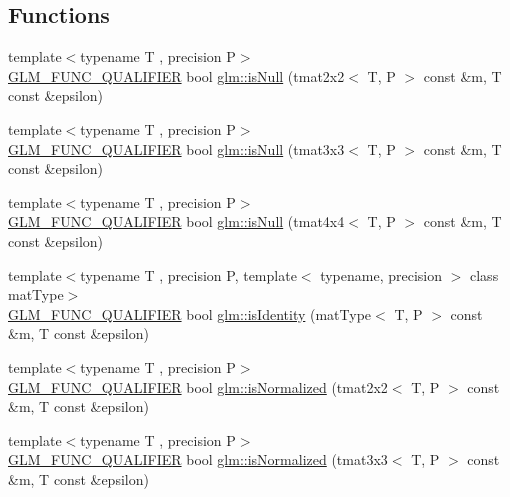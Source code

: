 \subsection*{Functions}
\begin{DoxyCompactItemize}
\item 
{\footnotesize template$<$typename T , precision P$>$ }\\\mbox{\hyperlink{setup_8hpp_a33fdea6f91c5f834105f7415e2a64407}{G\+L\+M\+\_\+\+F\+U\+N\+C\+\_\+\+Q\+U\+A\+L\+I\+F\+I\+ER}} bool \mbox{\hyperlink{group__gtx__matrix__query_ga37e535cbeaea383b8c1247b98875cd4b}{glm\+::is\+Null}} (tmat2x2$<$ T, P $>$ const \&m, T const \&epsilon)
\item 
{\footnotesize template$<$typename T , precision P$>$ }\\\mbox{\hyperlink{setup_8hpp_a33fdea6f91c5f834105f7415e2a64407}{G\+L\+M\+\_\+\+F\+U\+N\+C\+\_\+\+Q\+U\+A\+L\+I\+F\+I\+ER}} bool \mbox{\hyperlink{group__gtx__matrix__query_gac67a5c7e029a84b74b02ac9599b8972d}{glm\+::is\+Null}} (tmat3x3$<$ T, P $>$ const \&m, T const \&epsilon)
\item 
{\footnotesize template$<$typename T , precision P$>$ }\\\mbox{\hyperlink{setup_8hpp_a33fdea6f91c5f834105f7415e2a64407}{G\+L\+M\+\_\+\+F\+U\+N\+C\+\_\+\+Q\+U\+A\+L\+I\+F\+I\+ER}} bool \mbox{\hyperlink{group__gtx__matrix__query_ga326de496972051413c7b44b85fc9cb6e}{glm\+::is\+Null}} (tmat4x4$<$ T, P $>$ const \&m, T const \&epsilon)
\item 
{\footnotesize template$<$typename T , precision P, template$<$ typename, precision $>$ class mat\+Type$>$ }\\\mbox{\hyperlink{setup_8hpp_a33fdea6f91c5f834105f7415e2a64407}{G\+L\+M\+\_\+\+F\+U\+N\+C\+\_\+\+Q\+U\+A\+L\+I\+F\+I\+ER}} bool \mbox{\hyperlink{group__gtx__matrix__query_gafc1ce12c738b8c5d007179e615609330}{glm\+::is\+Identity}} (mat\+Type$<$ T, P $>$ const \&m, T const \&epsilon)
\item 
{\footnotesize template$<$typename T , precision P$>$ }\\\mbox{\hyperlink{setup_8hpp_a33fdea6f91c5f834105f7415e2a64407}{G\+L\+M\+\_\+\+F\+U\+N\+C\+\_\+\+Q\+U\+A\+L\+I\+F\+I\+ER}} bool \mbox{\hyperlink{group__gtx__matrix__query_ga11a8d5cdb36496b85f61e4f5f7f2602c}{glm\+::is\+Normalized}} (tmat2x2$<$ T, P $>$ const \&m, T const \&epsilon)
\item 
{\footnotesize template$<$typename T , precision P$>$ }\\\mbox{\hyperlink{setup_8hpp_a33fdea6f91c5f834105f7415e2a64407}{G\+L\+M\+\_\+\+F\+U\+N\+C\+\_\+\+Q\+U\+A\+L\+I\+F\+I\+ER}} bool \mbox{\hyperlink{group__gtx__matrix__query_ga351bcc8d485d329b78cfa875e084964d}{glm\+::is\+Normalized}} (tmat3x3$<$ T, P $>$ const \&m, T const \&epsilon)

\end{DoxyCompactItemize}
